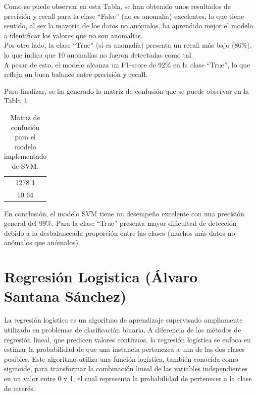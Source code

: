 \documentclass[12pt,letterpaper]{article}
\begin{document}
Como se puede observar en esta Tabla, se han obtenido unos resultados de precisión y recall para la clase ``False'' (no es anomalía) excelentes, lo que tiene sentido, al ser la mayoría de los datos no anómalos, ha aprendido mejor el modelo a identificar los valores que no son anomalías.\\
Por otro lado, la clase ``True'' (sí es anomalía) presenta un recall más bajo (86\%), lo que indica que 10 anomalías no fueron detectadas como tal.\\
A pesar de esto, el modelo alcanza un F1-score de 92\% en la clase ``True'', lo que refleja un buen balance entre precisión y recall.

Para finalizar, se ha generado la matriz de confusión que se puede observar en la Tabla \ref{tab:confusion-SVM}.
\begin{table}[htp]
    \centering
    \begin{tabular}{|c|}
    \hline
    1278 \hspace{8mm} 1 \\ 
    10 \hspace{10mm} 64 \\ \hline
    \end{tabular}
    \caption{Matriz de confusión para el modelo implementado de SVM.}
    \label{tab:confusion-SVM}
\end{table}

En conclusión, el modelo SVM tiene un desempeño excelente con una precisión general del 99\%. Para la clase ``True'' presenta mayor dificultad de detección debido a la desbalanceada proporción entre las clases (muchos más datos no anómalos que anómalos).

\section{Regresión Logistica (Álvaro Santana Sánchez)}

La regresión logística es un algoritmo de aprendizaje supervisado ampliamente utilizado en problemas de clasificación binaria. A diferencia de los métodos de regresión lineal, que predicen valores continuos, la regresión logística se enfoca en estimar la probabilidad de que una instancia pertenezca a una de las dos clases posibles. Este algoritmo utiliza una función logística, también conocida como sigmoide, para transformar la combinación lineal de las variables independientes en un valor entre 0 y 1, el cual representa la probabilidad de pertenecer a la clase de interés.
\end{document}
